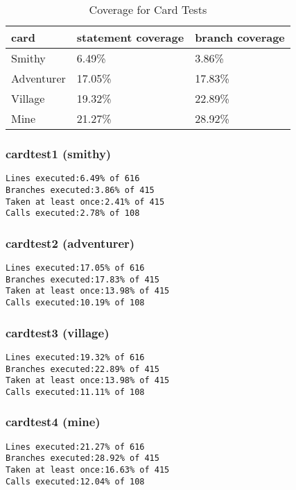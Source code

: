 \documentclass[11pt]{article}
\begin{document}
\begin{table}[htbp]
\caption{Coverage for Card Tests}
\centering
\begin{tabular}{lll}
card & statement coverage & branch coverage\\
\hline
Smithy & 6.49\% & 3.86\%\\
Adventurer & 17.05\% & 17.83\%\\
Village & 19.32\% & 22.89\%\\
Mine & 21.27\% & 28.92\%\\
\end{tabular}
\end{table}

\subsubsection{cardtest1 (smithy)}
\label{sec:cardtestsmithy}

\begin{verbatim}
Lines executed:6.49% of 616
Branches executed:3.86% of 415
Taken at least once:2.41% of 415
Calls executed:2.78% of 108
\end{verbatim}

\subsubsection{cardtest2 (adventurer)}
\label{sec:cardtestadventurer}

\begin{verbatim}
Lines executed:17.05% of 616
Branches executed:17.83% of 415
Taken at least once:13.98% of 415
Calls executed:10.19% of 108
\end{verbatim}

\subsubsection{cardtest3 (village)}
\label{sec:cardtestvillage}

\begin{verbatim}
Lines executed:19.32% of 616
Branches executed:22.89% of 415
Taken at least once:13.98% of 415
Calls executed:11.11% of 108
\end{verbatim}

\subsubsection{cardtest4 (mine)}
\label{sec:cardtestmine}

\begin{verbatim}
Lines executed:21.27% of 616
Branches executed:28.92% of 415
Taken at least once:16.63% of 415
Calls executed:12.04% of 108
\end{verbatim}
\end{document}
